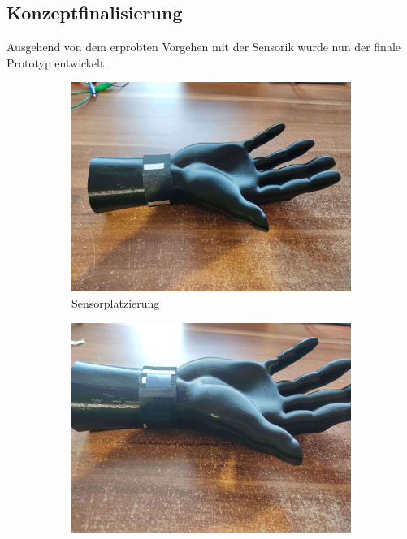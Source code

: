\documentclass[11pt, a4paper]{article}
\begin{document}
\subsection{Konzeptfinalisierung}

Ausgehend von dem erprobten Vorgehen mit der Sensorik wurde nun der finale Prototyp entwickelt.
\begin{figure}[h]
	\begin{subfigure}[c]{0.33\textwidth}
		\includegraphics[scale=.037]{assets/Strap_fitting_wires.jpg}
		\caption{Sensorplatzierung}
		\label{fig:Initial_drawing1}
	\end{subfigure}
	\begin{subfigure}[c]{0.33\textwidth}
		\includegraphics[scale=.037]{assets/Strap_fitting_sensors.jpg}

\end{subfigure}
\end{figure}
\end{document}
